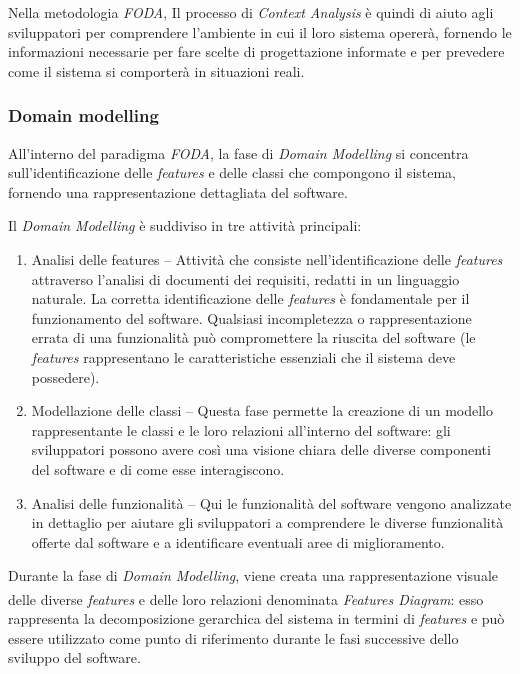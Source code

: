 \documentclass[12pt]{report}
\newcommand{\myref}[1]{\textsuperscript{\hyperref[#1]{\ding{70}}}}
\newcommand{\foda}{\textsl{FODA}\xspace}
\begin{document}
Nella metodologia \foda, Il processo di \textit{Context Analysis} è quindi di aiuto agli sviluppatori per comprendere l'ambiente in cui il loro sistema opererà, fornendo le informazioni necessarie per fare scelte di progettazione informate e per prevedere come il sistema si comporterà in situazioni reali.


\subsubsection{Domain modelling}

All'interno del paradigma \foda, la fase di \textit{Domain Modelling} si concentra sull'identificazione delle \textit{features} e delle classi che compongono il sistema, fornendo una rappresentazione dettagliata del software.

Il \textit{Domain Modelling} è suddiviso in tre attività principali:

\begin{enumerate}
\item \textsf{Analisi delle features} -- Attività che consiste nell'identificazione delle \textit{features} attraverso l'analisi di documenti dei requisiti, redatti in un linguaggio naturale. La corretta identificazione delle \textit{features} è fondamentale per il funzionamento del software. Qualsiasi incompletezza o rappresentazione errata di una funzionalità può compromettere la riuscita del software (le \textit{features} rappresentano le caratteristiche essenziali che il sistema deve possedere).
\item \textsf{Modellazione delle classi} -- Questa fase permette la creazione di un modello rappresentante le classi e le loro relazioni all'interno del software: gli sviluppatori possono avere così una visione chiara delle diverse componenti del software e di come esse interagiscono.
\item \textsf{Analisi delle funzionalità} -- Qui le funzionalità del software vengono analizzate in dettaglio per aiutare gli sviluppatori a comprendere le diverse funzionalità offerte dal software e a identificare eventuali aree di miglioramento.
\end{enumerate}

Durante la fase di \textit{Domain Modelling}, viene creata una rappresentazione visuale delle diverse \textit{features} e delle loro relazioni denominata \textit{Features Diagram}\myref{sec:features_diagram}: esso rappresenta la decomposizione gerarchica del sistema in termini di \textit{features} e può essere utilizzato come punto di riferimento durante le fasi successive dello sviluppo del software.
\end{document}
